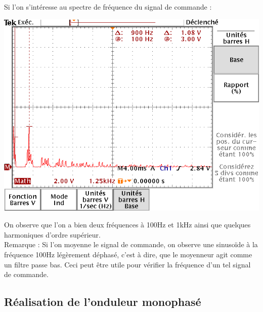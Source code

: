 \documentclass[10pt,a4paper]{article}
\begin{document}
	Si l'on s'intéresse au spectre de fréquence du signal de commande :
	\begin{center}
	\includegraphics[scale=0.4]{fftm03f100.png}
	\end{center}
	On observe que l'on a bien deux fréquences à 100Hz et 1kHz ainsi que quelques harmoniques d'ordre supérieur. \\
	
	Remarque : Si l'on moyenne le signal de commande, on observe une sinusoïde à la fréquence 100Hz légèrement déphasé, c'est à dire, que le moyenneur agit comme un filtre passe bas. Ceci peut être utile pour vérifier la fréquence d'un tel signal de commande.
	\subsection{Réalisation de l'onduleur monophasé}
	
\end{document}
